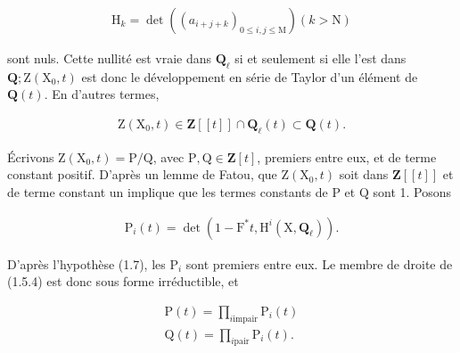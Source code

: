\documentclass[10pt,leqno]{article}
\begin{document}
\begin{equation*}\begin{gathered}\mathrm{H}_{k} = \operatorname{det}((a_{i+j+k})_{0\leq i,j\leq \mathrm{M}})    (k>\mathrm{N})\end{gathered}\end{equation*}

\noindent sont nuls. Cette nullité est vraie dans \(\mathbf{Q}_{\ell }\) si et seulement si elle l’est dans \(\mathbf{Q}; \mathrm{Z}(\mathrm{X}_{0},t)\) est donc le développement en série de Taylor d’un élément de \(\mathbf{Q}(t)\). En d’autres termes,\par

\begin{equation*}\begin{gathered}\mathrm{Z}(\mathrm{X}_{0},t) \in  \mathbf{Z}[[t]] \cap  \mathbf{Q}_{\ell }(t) \subset  \mathbf{Q}(t).\end{gathered}\end{equation*}

\noindent Écrivons \(\mathrm{Z}(\mathrm{X}_{0},t)=\mathrm{P}/\mathrm{Q}\), avec \(\mathrm{P},\mathrm{Q}\in \mathbf{Z}[t]\), premiers entre eux, et de terme constant positif. D’après un lemme de Fatou, que \(\mathrm{Z}(\mathrm{X}_{0},t)\) soit dans \(\mathbf{Z}[[t]]\) et de terme constant un implique que les termes constants de \(\mathrm{P}\) et \(\mathrm{Q}\) sont 1. Posons\par

\begin{equation*}\begin{gathered}\mathrm{P}_{i}(t)=\operatorname{det}(1- \mathrm{F}^{*}t, \mathrm{H}^{i}(\mathrm{X},\mathbf{Q}_{\ell })).\end{gathered}\end{equation*}

\clearpage

\label{physical-6}

\noindent D’après l’hypothèse (1.7), les \(\mathrm{P}_{i}\) sont premiers entre eux. Le membre de droite de (1.5.4) est donc sous forme irréductible, et\par

\begin{equation*}\begin{gathered}\mathrm{P}(t) = \prod _{i \text{impair}} \mathrm{P}_{i}(t) \\ \mathrm{Q}(t) = \prod _{i \text{pair}} \mathrm{P}_{i}(t).\end{gathered}\end{equation*}
\end{document}
